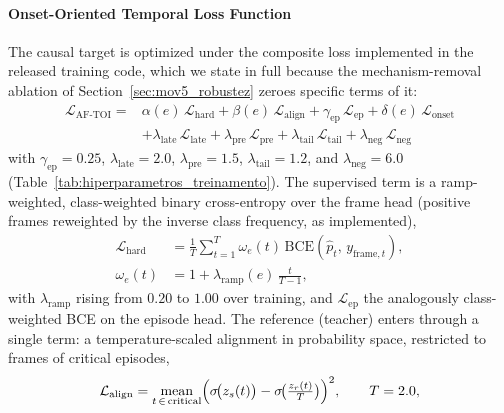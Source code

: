 \documentclass[a4paper,fleqn]{cas-dc}
\begin{document}
\paragraph{Onset-Oriented Temporal Loss Function}
{\color{\revcolor}The causal target is optimized under the composite loss
implemented in the released training code, which we state in full because the
mechanism-removal ablation of Section~\ref{sec:mov5_robustez} zeroes specific
terms of it:
\begin{equation}
\begin{aligned}
  \mathcal{L}_{\mathrm{AF\text{-}TOI}} ={}& \alpha(e)\,\mathcal{L}_{\text{hard}}
    + \beta(e)\,\mathcal{L}_{\text{align}}
    + \gamma_{\mathrm{ep}}\,\mathcal{L}_{\text{ep}}
    + \delta(e)\,\mathcal{L}_{\text{onset}} \\
    &+ \lambda_{\text{late}}\,\mathcal{L}_{\text{late}}
    + \lambda_{\text{pre}}\,\mathcal{L}_{\text{pre}}
    + \lambda_{\text{tail}}\,\mathcal{L}_{\text{tail}}
    + \lambda_{\text{neg}}\,\mathcal{L}_{\text{neg}}
\end{aligned}
  \label{eq:perda_total_aftoi}
\end{equation}
with $\gamma_{\mathrm{ep}}{=}0.25$, $\lambda_{\text{late}}{=}2.0$,
$\lambda_{\text{pre}}{=}1.5$, $\lambda_{\text{tail}}{=}1.2$, and
$\lambda_{\text{neg}}{=}6.0$ (Table~\ref{tab:hiperparametros_treinamento}).
The supervised term is a ramp-weighted, class-weighted binary cross-entropy
over the frame head (positive frames reweighted by the inverse class
frequency, as implemented),
\begin{equation}
\begin{aligned}
  \mathcal{L}_{\text{hard}} &= \frac{1}{T}\sum_{t=1}^{T} \omega_e(t)\,
    \mathrm{BCE}\!\left(\hat{p}_t,\, y_{\text{frame},t}\right), \\
  \omega_e(t) &= 1 + \lambda_{\mathrm{ramp}}(e)\,\tfrac{t}{T-1},
\end{aligned}
  \label{eq:perda_hard_aftoi}
\end{equation}
with $\lambda_{\mathrm{ramp}}$ rising from $0.20$ to $1.00$ over training, and
$\mathcal{L}_{\text{ep}}$ the analogously class-weighted BCE on the episode head. The reference
(teacher) enters through a single term: a temperature-scaled alignment in
probability space, restricted to frames of critical episodes,
\begin{equation}
  \mathcal{L}_{\text{align}} = \operatorname*{mean}_{t \,\in\, \text{critical}}
    \Bigl(\sigma\!\bigl(z_s(t)\bigr) -
    \sigma\!\bigl(\tfrac{z_r(t)}{T}\bigr)\Bigr)^{2}, \qquad T = 2.0,

\end{equation}}
\end{document}
